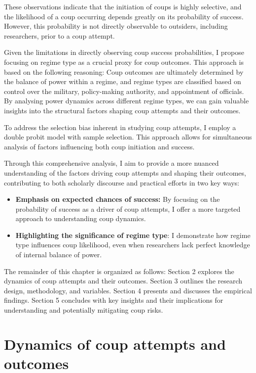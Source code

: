 \documentclass[
  12pt,
]{report}
\begin{document}
These observations indicate that the initiation of coups is highly
selective, and the likelihood of a coup occurring depends greatly on its
probability of success. However, this probability is not directly
observable to outsiders, including researchers, prior to a coup attempt.

Given the limitations in directly observing coup success probabilities,
I propose focusing on regime type as a crucial proxy for coup outcomes.
This approach is based on the following reasoning: Coup outcomes are
ultimately determined by the balance of power within a regime, and
regime types are classified based on control over the military,
policy-making authority, and appointment of officials. By analysing
power dynamics across different regime types, we can gain valuable
insights into the structural factors shaping coup attempts and their
outcomes.

To address the selection bias inherent in studying coup attempts, I
employ a double probit model with sample selection. This approach allows
for simultaneous analysis of factors influencing both coup initiation
and success.

Through this comprehensive analysis, I aim to provide a more nuanced
understanding of the factors driving coup attempts and shaping their
outcomes, contributing to both scholarly discourse and practical efforts
in two key ways:

\begin{itemize}
\item
  \textbf{Emphasis on expected chances of success:} By focusing on the
  probability of success as a driver of coup attempts, I offer a more
  targeted approach to understanding coup dynamics.
\item
  \textbf{Highlighting the significance of regime type}: I demonstrate
  how regime type influences coup likelihood, even when researchers lack
  perfect knowledge of internal balance of power.
\end{itemize}

The remainder of this chapter is organized as follows: Section 2
explores the dynamics of coup attempts and their outcomes. Section 3
outlines the research design, methodology, and variables. Section 4
presents and discusses the empirical findings. Section 5 concludes with
key insights and their implications for understanding and potentially
mitigating coup risks.

\section{Dynamics of coup attempts and
outcomes}\label{dynamics-of-coup-attempts-and-outcomes}
\end{document}
